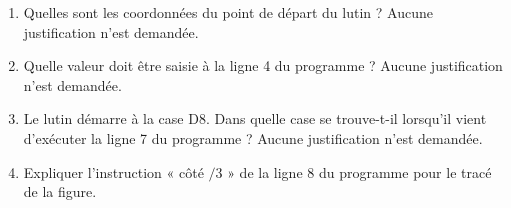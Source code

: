 \documentclass[exercice,a4]{thedocument}%
\begin{document}
\begin{enumerate}
    \item Quelles sont les coordonnées du point de départ du lutin ?
    Aucune justification n'est demandée.
    \item Quelle valeur doit être saisie à la ligne 4 du programme ?
    Aucune justification n'est demandée.
    \item Le lutin démarre à la case D8. Dans quelle case se trouve-t-il
    lorsqu'il vient d'exécuter la ligne 7 du programme ? Aucune justification
    n'est demandée.
\end{enumerate}

\begin{center}
\end{center}

\begin{enumerate}
    \setcounter{enumi}{3}
    \item Expliquer l'instruction « côté $/3$ » de la ligne 8 du programme
    pour le tracé de la figure.
\end{enumerate}
\showthesource
\end{document}
